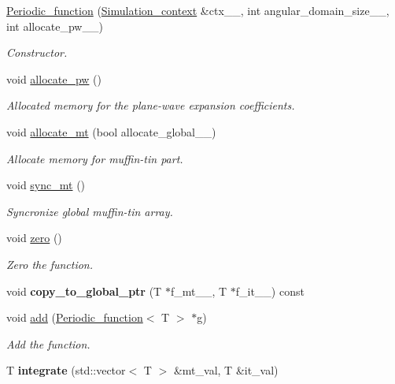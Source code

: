 \begin{DoxyCompactItemize}
\item 
\hyperlink{classsirius_1_1_periodic__function_a4e94eb2f28bd9a136f597397fc87bf0a}{Periodic\+\_\+function} (\hyperlink{classsirius_1_1_simulation__context}{Simulation\+\_\+context} \&ctx\+\_\+\+\_\+, int angular\+\_\+domain\+\_\+size\+\_\+\+\_\+, int allocate\+\_\+pw\+\_\+\+\_\+)
\begin{DoxyCompactList}\small\item\em Constructor. \end{DoxyCompactList}\item 
void \hyperlink{classsirius_1_1_periodic__function_aae2151654d31f5985af2b9cee88e4cb2}{allocate\+\_\+pw} ()
\begin{DoxyCompactList}\small\item\em Allocated memory for the plane-\/wave expansion coefficients. \end{DoxyCompactList}\item 
void \hyperlink{classsirius_1_1_periodic__function_a7d05cae35bbee9ab1c825ad28520b415}{allocate\+\_\+mt} (bool allocate\+\_\+global\+\_\+\+\_\+)
\begin{DoxyCompactList}\small\item\em Allocate memory for muffin-\/tin part. \end{DoxyCompactList}\item 
void \hyperlink{classsirius_1_1_periodic__function_a2f20ff1fcb7fb4177dd1bda999c3af91}{sync\+\_\+mt} ()
\begin{DoxyCompactList}\small\item\em Syncronize global muffin-\/tin array. \end{DoxyCompactList}\item 
void \hyperlink{classsirius_1_1_periodic__function_a96f5eb8ba8a0fc5f2166ab3554185221}{zero} ()
\begin{DoxyCompactList}\small\item\em Zero the function. \end{DoxyCompactList}\item 
\hypertarget{classsirius_1_1_periodic__function_ac6c7686a09744a200b91349d63bcf9f0}{}void {\bfseries copy\+\_\+to\+\_\+global\+\_\+ptr} (T $\ast$f\+\_\+mt\+\_\+\+\_\+, T $\ast$f\+\_\+it\+\_\+\+\_\+) const \label{classsirius_1_1_periodic__function_ac6c7686a09744a200b91349d63bcf9f0}

\item 
void \hyperlink{classsirius_1_1_periodic__function_a39e334ef18345209c9b1f439aa8c2e86}{add} (\hyperlink{classsirius_1_1_periodic__function}{Periodic\+\_\+function}$<$ T $>$ $\ast$g)
\begin{DoxyCompactList}\small\item\em Add the function. \end{DoxyCompactList}\item 
\hypertarget{classsirius_1_1_periodic__function_a986bbcd26bf61bbc9259727bd291466d}{}T {\bfseries integrate} (std\+::vector$<$ T $>$ \&mt\+\_\+val, T \&it\+\_\+val)\label{classsirius_1_1_periodic__function_a986bbcd26bf61bbc9259727bd291466d}


\end{DoxyCompactItemize}
